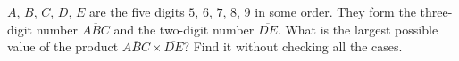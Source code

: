 $A$, $B$, $C$, $D$, $E$ are the five digits $5$, $6$, $7$, $8$, $9$ in some order. They form the three-digit number $\overline{ABC}$ and the two-digit number $\overline{DE}$. What is the largest possible value of the product $\overline{ABC}\times\overline{DE}$? Find it without checking all the cases.
